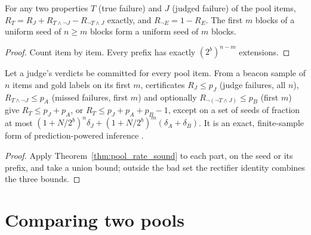 \begin{lemma}\label{lem:rectifier}
\leanok
For any two properties $T$ (true failure) and $J$ (judged failure) of the pool items,
$R_T = R_J + R_{T\wedge\neg J} - R_{\neg T\wedge J}$ exactly, and $R_{\neg E}=1-R_E$. The first
$m$ blocks of a uniform seed of $n\ge m$ blocks form a uniform seed of $m$ blocks.
\end{lemma}
\begin{proof}
\leanok
Count item by item. Every prefix has exactly $(2^b)^{n-m}$ extensions.
\end{proof}

\begin{theorem}\label{thm:judged_rate}
\leanok
{}
Let a judge's verdicts be committed for every pool item. From a beacon sample of $n$ items and
gold labels on its first $m$, certificates $R_J\le p_J$ (judge failures, all $n$),
$R_{T\wedge\neg J}\le p_A$ (missed failures, first $m$) and optionally $R_{\neg(\neg T\wedge J)}\le p_B$
(first $m$) give $R_T\le p_J+p_A$, or $R_T\le p_J+p_A+p_B-1$, except on a set of seeds of fraction
at most $(1+N/2^b)^n\delta_J+(1+N/2^b)^m(\delta_A+\delta_B)$. It is an exact, finite-sample form of
prediction-powered inference \cite{angelopoulos2023prediction}.
\end{theorem}
\begin{proof}
\leanok
Apply Theorem~\ref{thm:pool_rate_sound} to each part, on the seed or its prefix, and take a union
bound; outside the bad set the rectifier identity combines the three bounds.
\end{proof}

\section{Comparing two pools}

